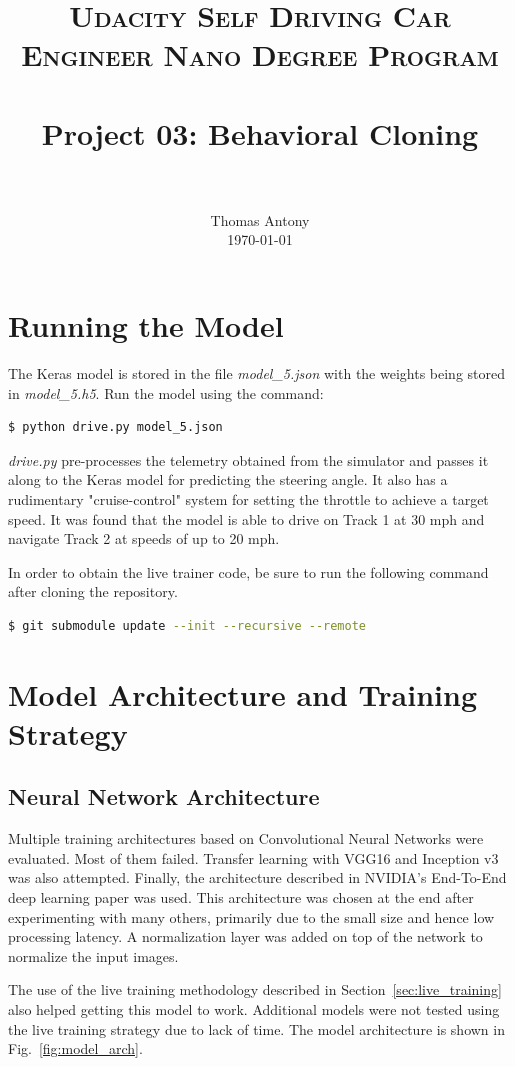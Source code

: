 \documentclass[paper=letter, fontsize=11pt]{scrartcl}
\title{
		\usefont{OT1}{bch}{b}{n}
		\normalfont \normalsize \textsc{Udacity Self Driving Car Engineer Nano Degree Program} \\ [25pt]
		\horrule{0.5pt} \\[0.4cm]
		\huge Project 03: Behavioral Cloning \\
		\horrule{2pt} \\[0.5cm]
}
\author{
		\normalfont 								\normalsize
        Thomas Antony\\[-3pt]		\normalsize
        \today
}
\date{}
\numberwithin{equation}{section}		%
\numberwithin{figure}{section}			%
\numberwithin{table}{section}				%
\begin{document}
\maketitle
\section{Running the Model}
The Keras model is stored in the file \emph{model\_5.json} with the weights being stored in \emph{model\_5.h5}. Run the model using the command:

\begin{lstlisting}[language=bash]
$ python drive.py model_5.json
\end{lstlisting}

\texttt{}

\emph{drive.py} pre-processes the telemetry obtained from the simulator and passes it along to the Keras model for predicting the steering angle. It also has a rudimentary "cruise-control" system for setting the throttle to achieve a target speed. It was found that the model is able to drive on Track 1 at 30 mph and navigate Track 2 at speeds of up to 20 mph.

In order to obtain the live trainer code, be sure to run the following command after cloning the repository.

\begin{lstlisting}[language=bash]
$ git submodule update --init --recursive --remote
\end{lstlisting}

\section{Model Architecture and Training Strategy}

\subsection{Neural Network Architecture}
Multiple training architectures based on Convolutional Neural Networks were evaluated. Most of them failed. Transfer learning with VGG16 and Inception v3 was also attempted. Finally, the architecture described in NVIDIA's End-To-End deep learning paper\cite{nvidia:endtoend2016} was used. This architecture was chosen at the end after experimenting with many others, primarily due to the small size and hence low processing latency. A normalization layer was added on top of the network to normalize the input images.

The use of the live training methodology described in Section~\ref{sec:live_training} also helped getting this model to work. Additional models were not tested using the live training strategy due to lack of time. The model architecture is shown in Fig.~\ref{fig:model_arch}.
\end{document}
